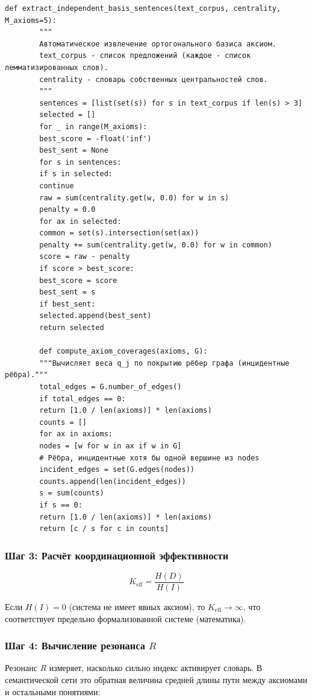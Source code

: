 \documentclass[12pt,a4paper]{article}
\begin{document}
	\begin{lstlisting}[caption={Функция извлечения независимого базиса аксиом}, label={lst:basis}]
		def extract_independent_basis_sentences(text_corpus, centrality, M_axioms=5):
		"""
		Автоматическое извлечение ортогонального базиса аксиом.
		text_corpus - список предложений (каждое - список лемматизированных слов).
		centrality - словарь собственных центральностей слов.
		"""
		sentences = [list(set(s)) for s in text_corpus if len(s) > 3]
		selected = []
		for _ in range(M_axioms):
		best_score = -float('inf')
		best_sent = None
		for s in sentences:
		if s in selected:
		continue
		raw = sum(centrality.get(w, 0.0) for w in s)
		penalty = 0.0
		for ax in selected:
		common = set(s).intersection(set(ax))
		penalty += sum(centrality.get(w, 0.0) for w in common)
		score = raw - penalty
		if score > best_score:
		best_score = score
		best_sent = s
		if best_sent:
		selected.append(best_sent)
		return selected
		
		def compute_axiom_coverages(axioms, G):
		"""Вычисляет веса q_j по покрытию рёбер графа (инцидентные рёбра)."""
		total_edges = G.number_of_edges()
		if total_edges == 0:
		return [1.0 / len(axioms)] * len(axioms)
		counts = []
		for ax in axioms:
		nodes = [w for w in ax if w in G]
		# Рёбра, инцидентные хотя бы одной вершине из nodes
		incident_edges = set(G.edges(nodes))
		counts.append(len(incident_edges))
		s = sum(counts)
		if s == 0:
		return [1.0 / len(axioms)] * len(axioms)
		return [c / s for c in counts]
	\end{lstlisting}
	
	\subsubsection{Шаг 3: Расчёт координационной эффективности}
	
	\[
	\boxed{
		K_{\mathrm{eff}} = \frac{H(D)}{H(I)}
	}
	\]
	
	Если \(H(I) = 0\) (система не имеет явных аксиом), то \(K_{\mathrm{eff}} \to \infty\), что соответствует предельно формализованной системе (математика).
	
	\subsubsection{Шаг 4: Вычисление резонанса \(R\)}
	
	Резонанс \(R\) измеряет, насколько сильно индекс активирует словарь. В семантической сети это обратная величина средней длины пути между аксиомами и остальными понятиями:
	
\end{document}

